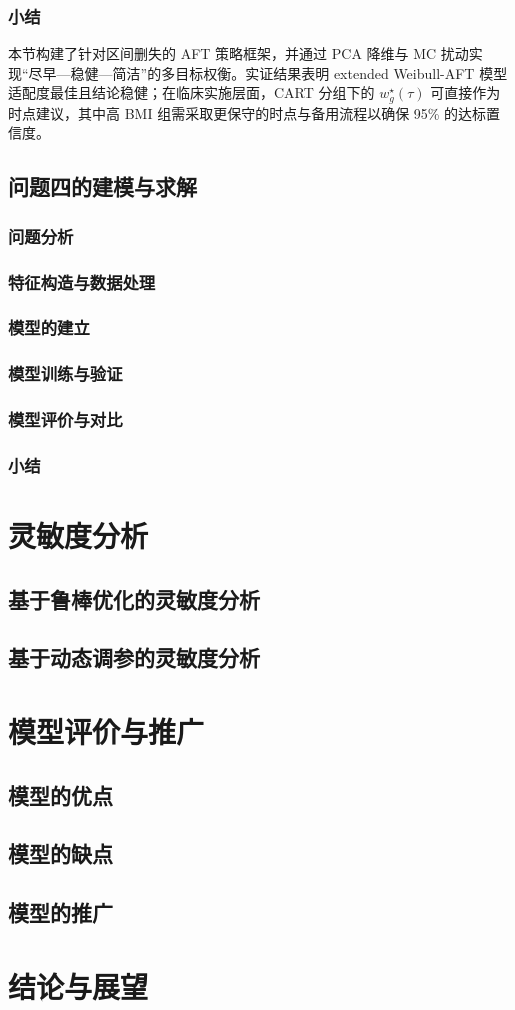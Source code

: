 \documentclass[withoutpreface]{cumcmthesis}
\begin{document}
\subsubsection{小结}
本节构建了针对区间删失的 AFT 策略框架，并通过 PCA 降维与 MC 扰动实现“尽早—稳健—简洁”的多目标权衡。实证结果表明 extended Weibull-AFT 模型适配度最佳且结论稳健；在临床实施层面，CART 分组下的 $w^{\star}_g(\tau)$ 可直接作为时点建议，其中高 BMI 组需采取更保守的时点与备用流程以确保 95\% 的达标置信度。

\subsection{问题四的建模与求解}
\subsubsection{问题分析}
\subsubsection{特征构造与数据处理}
\subsubsection{模型的建立}
\subsubsection{模型训练与验证}
\subsubsection{模型评价与对比}
\subsubsection{小结}

\section{灵敏度分析}
\subsection{基于鲁棒优化的灵敏度分析}
\subsection{基于动态调参的灵敏度分析}

\section{模型评价与推广}
\subsection{模型的优点}
\subsection{模型的缺点}
\subsection{模型的推广}

\section{结论与展望}



\end{document}
